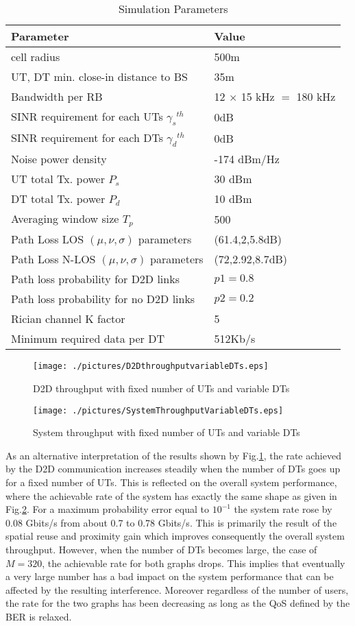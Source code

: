 \documentclass[conference,onecolumn,12pt]{IEEEtran}
\begin{document}
\begin{table}[!t]
\caption{Simulation Parameters} \label{SimulationParameters}
\centering
\begin{center}
\begin{tabular}{|M{5cm}|M{3cm}|}
\hline
\textbf{Parameter} &  \textbf{Value} \tabularnewline
\hline
    cell radius  & 500m \tabularnewline
\hline
   UT, DT min. close-in distance to BS & 35m  \tabularnewline
\hline
   Bandwidth per RB & 12 $\times$ 15 kHz $=$ 180 kHz \tabularnewline
\hline
   SINR requirement for each UTs ${\gamma_s}^{th}$  & 0dB \tabularnewline
\hline
   SINR requirement for each DTs ${\gamma_d}^{th}$  & 0dB \tabularnewline
\hline
   Noise power density & -174 dBm/Hz \tabularnewline
\hline
   UT total Tx. power $P_s$  & 30 dBm \tabularnewline
\hline
   DT total Tx. power $P_d$ & 10 dBm \tabularnewline
\hline
   Averaging window size $T_{p}$  & 500 \tabularnewline
\hline
    Path Loss LOS $(\mu,\nu,\sigma)$ parameters &  (61.4,2,5.8dB)\tabularnewline
\hline
   Path Loss N-LOS $(\mu,\nu,\sigma)$ parameters & (72,2.92,8.7dB)\tabularnewline
\hline
   Path loss probability for D2D links & $p1=0.8$ \tabularnewline
\hline
   Path loss probability for no D2D links & $p2=0.2$ \tabularnewline
\hline
Rician channel K factor & 5 \tabularnewline
\hline
Minimum required data per DT & 512Kb/s \tabularnewline
\hline
\hline
\end{tabular}
\end{center}
\end{table}
\begin{figure}
\centering
\texttt{[image: ./pictures/D2DthroughputvariableDTs.eps]}
\caption{D2D throughput with fixed number of UTs and variable DTs }\label{D2DthroughputvariableDTs}
\end{figure}
\begin{figure}
\centering
\texttt{[image: ./pictures/SystemThroughputVariableDTs.eps]}
\caption{System throughput with fixed number of UTs and variable DTs }\label{SystemThroughputVariableDTs}
\end{figure}
As an alternative interpretation of the results shown by Fig.\ref{D2DthroughputvariableDTs}, the rate achieved by the D2D communication increases steadily when the number of DTs goes up for a fixed number of UTs. This is reflected on the overall system performance, where the achievable rate of the  system has exactly the same shape as given in Fig.\ref{SystemThroughputVariableDTs}. For a maximum probability error equal to $10^{-1}$ the system rate rose by 0.08 Gbits/s from about 0.7 to 0.78  Gbits/s. This is primarily the result of the spatial reuse and proximity gain which improves consequently the overall system throughput. However, when the number of DTs becomes large, the case of $M=320$, the achievable rate for both graphs drops. This implies that eventually a very large number has a bad impact on the system performance that can be affected by the resulting interference. Moreover regardless of the number of users, the rate for the two graphs has been decreasing as long as the QoS defined by the BER is relaxed.\\
\end{document}
